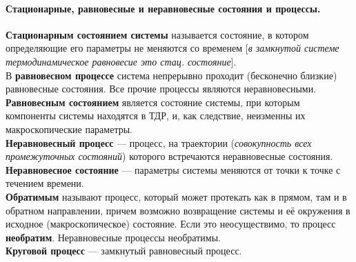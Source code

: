 \paragraph{Стационарные, равновесные и неравновесные состояния и процессы.}
\textbf{Стационарным состоянием системы} называется состояние, в котором определяющие его параметры не меняются со временем [\textit{в замкнутой системе термодинамическое равновесие это стац. состояние}].\\
В \textbf{равновесном процессе} система непрерывно проходит (бесконечно близкие) равновесные состояния. Все прочие процессы являются неравновесными.\\
\textbf{Равновесным состоянием} является состояние системы, при которым компоненты системы находятся в ТДР, и, как следствие, неизменны их макроскопические параметры. \\
\textbf{Неравновесный процесс} --- процесс, на траектории (\textit{совокупность всех промежуточных состояний}) которого встречаются неравновесные состояния.\\
\textbf{Неравновесное состояние} --- параметры системы меняются от точки к точке с течением времени.\\
\textbf{Обратимым} называют процесс, который может протекать как в прямом, там и в обратном направлении, причем возможно возвращение системы и её окружения в исходное (макроскопическое) состояние. Если это неосуществимо, то процесс \textbf{необратим}. Неравновесные процессы необратимы. \\
\textbf{Круговой процесс} --- замкнутый равновесный процесс.